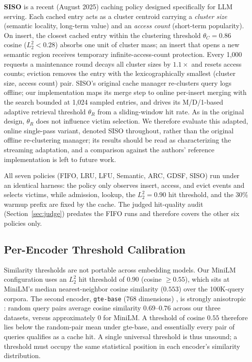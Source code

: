 \documentclass[sigconf,nonacm]{acmart}
\begin{document}
\textbf{SISO} \cite{kim2025siso} is a recent (August 2025) caching policy designed specifically for LLM serving. Each cached entry acts as a cluster centroid carrying a \emph{cluster size} (semantic locality, long-term value) and an \emph{access count} (short-term popularity). On insert, the closest cached entry within the clustering threshold
$\theta_C = 0.86$ cosine ($L_2^2 < 0.28$) absorbs one unit of cluster mass; an insert that opens a new semantic region receives temporary infinite-access-count protection. Every 1{,}000 requests a maintenance round decays all cluster sizes by $1.1\times$ and resets access counts; eviction removes the entry with the lexicographically smallest (cluster size, access count) pair. SISO's original cache manager re-clusters query logs offline; our implementation maps its merge step to online per-insert merging with the search bounded at 1{,}024 sampled entries, and drives its M/D/1-based adaptive retrieval threshold $\theta_R$ from a sliding-window hit rate. As in the original design, $\theta_R$ does not influence victim selection. We therefore evaluate this adapted, online single-pass variant, denoted SISO throughout, rather than the original offline re-clustering manager; its results should be read as characterizing the streaming adaptation, and a comparison against the authors' reference implementation is left to future work.

All seven policies (FIFO, LRU, LFU, Semantic, ARC, GDSF, SISO) run under an identical harness: the policy only observes insert, access, and evict events and selects victims, while admission, lookup, the
$L_2^2 = 0.90$ hit threshold, and the 30\% warmup prefix are fixed by the cache. The judged hit-quality audit (Section~\ref{sec:judge}) predates the FIFO runs and therefore covers the other six policies only.

\subsection{Per-Encoder Threshold Calibration}
\label{sec:calibration}
Similarity thresholds are not portable across embedding models. Our MiniLM
configuration uses an $L_2^2$ hit threshold of $0.90$ (cosine $\geq 0.55$),
which sits at MiniLM's median nearest-neighbor cosine similarity ($0.553$)
over the 100K-query corpora. The second encoder, \texttt{gte-base} (768
dimensions) \cite{li2023gte}, is strongly anisotropic
\cite{ethayarajh2019contextual}: random query pairs
average cosine similarity $0.69$--$0.76$ across our three datasets, versus
approximately $0$ for MiniLM. A threshold of cosine $0.55$ therefore lies
below the random-pair mean under gte-base, and essentially every pair
of queries qualifies as a cache hit. A single universal threshold is thus
unsound; a threshold must occupy the same statistical position in each
encoder's similarity distribution.
\end{document}
